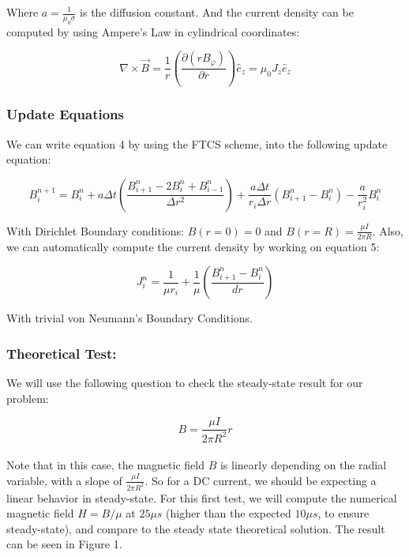 \documentclass{article}
\begin{document}
Where $a = \frac{1}{\mu_0 \sigma}$ is the diffusion constant. And the current density can be computed by using Ampere's Law in cylindrical coordinates: 

\begin{equation}
\nabla \times \vec{B} = \frac{1}{r} \left(\frac{\partial (r B_{\varphi})}{\partial r}\right)\hat{e}_z = \mu_0 J_z \hat{e}_z
\end{equation}

\subsubsection{Update Equations}
We can write equation 4 by using the FTCS scheme, into the following update equation:

\begin{equation}
B_i^{n+1} = B_i^n + a \Delta t \left( \frac{B_{i+1}^n - 2B_i^n + B_{i-1}^n}{\Delta r^2} \right) + \frac{a \Delta t}{r_i \Delta r}(B_{i+1}^n - B_i^n) - \frac{a}{r_i^2}B_i^n
\end{equation}

With Dirichlet Boundary conditions:  $B(r=0) = 0$ and $B(r=R) = \frac{\mu I}{2 \pi R}$. Also, we can automatically compute the current density by working on equation 5:

\begin{equation}
J_i^n = \frac{1}{\mu r_i} + \frac{1}{\mu}\left(\frac{B_{i+1}^n - B_i^n}{dr}\right)
\end{equation} 

With trivial von Neumann's Boundary Conditions. 

\subsubsection{Theoretical Test:}

We will use the following question to check the steady-state result for our problem:

\begin{equation}
B = \frac{\mu I}{2 \pi R^2} r
\end{equation}
\\
Note that in this case, the magnetic field $B$ is linearly depending on the radial variable, with a slope of $\frac{\mu I}{2 \pi R^2}$. So for a DC current, we should be expecting a linear behavior in steady-state. For this first test, we will compute the numerical magnetic field $H = B/\mu $ at $25 \mu s$ (higher than the expected $10 \mu s$, to ensure steady-state), and compare to the steady state theoretical solution. The result can be seen in Figure 1.
\end{document}
